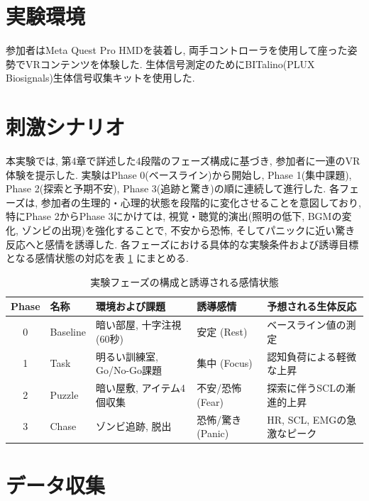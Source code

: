 \documentclass[book,paper=a4,fontsize=10pt,jafontscale=0.92]{jlreq}
\begin{document}
\section{実験環境}

参加者はMeta Quest Pro HMDを装着し,
両手コントローラを使用して座った姿勢でVRコンテンツを体験した.
生体信号測定のためにBITalino(PLUX Biosignals)生体信号収集キットを使用した.



\section{刺激シナリオ}
本実験では, 第4章で詳述した4段階のフェーズ構成に基づき, 参加者に一連のVR体験を提示した.
実験はPhase 0(ベースライン)から開始し, Phase 1(集中課題), Phase 2(探索と予期不安), Phase 3(追跡と驚き)の順に連続して進行した.
各フェーズは, 参加者の生理的・心理的状態を段階的に変化させることを意図しており,
特にPhase 2からPhase 3にかけては, 視覚・聴覚的演出(照明の低下, BGMの変化, ゾンビの出現)を強化することで,
不安から恐怖, そしてパニックに近い驚き反応へと感情を誘導した.
各フェーズにおける具体的な実験条件および誘導目標となる感情状態の対応を表 \ref{tab:experiment_phases} にまとめる.


\begin{table}[t]
  \caption{実験フェーズの構成と誘導される感情状態}
  \label{tab:experiment_phases}
  \centering
  \begin{tabular}{c|l|l|l|l}
    \hline
    Phase & 名称 & 環境および課題 & 誘導感情 & 予想される生体反応 \\
    \hline \hline
    0 & Baseline & 暗い部屋, 十字注視 (60秒) & 安定 (Rest) & ベースライン値の測定 \\
    \hline
    1 & Task & 明るい訓練室, Go/No-Go課題 & 集中 (Focus) & 認知負荷による軽微な上昇 \\
    \hline
    2 & Puzzle & 暗い屋敷, アイテム4個収集 & 不安/恐怖 (Fear) & 探索に伴うSCLの漸進的上昇 \\
    \hline
    3 & Chase & ゾンビ追跡, 脱出 & 恐怖/驚き (Panic) & HR, SCL, EMGの急激なピーク \\
    \hline
  \end{tabular}
\end{table}

\section{データ収集}
\end{document}
